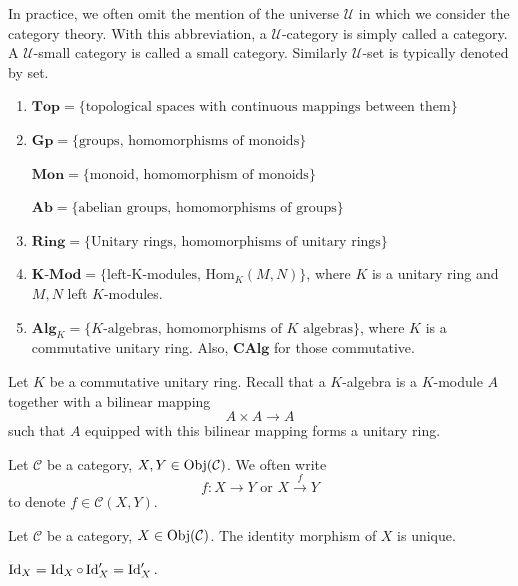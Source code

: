 \begin{remark}
    In practice, we often omit the mention of the universe $\mathcal{U}$ in which we consider the category theory. With this abbreviation, a $\mathcal{U}$-category is simply called a category. A $\mathcal{U}$-small category is called a small category. Similarly $\mathcal{U}$-set is typically denoted by set.
\end{remark}
\begin{notationenv}
    \quad
\begin{enumerate}[label=(\arabic*)]
    \item $\mathbf{Top} = \{\text{topological spaces with continuous mappings between them}\}$
    \item $\mathbf{Gp} = \{\text{groups, homomorphisms of monoids}\}$
    
        $\mathbf{Mon} = \{\text{monoid, homomorphism of monoids}\}$

        $\mathbf{Ab}= \{\text{abelian groups, homomorphisms of groups}\}$
    \item $\mathbf{Ring} = \{\text{Unitary rings, homomorphisms of unitary rings}\}$
    \item $\mathbf{K}\text{-}\mathbf{Mod} = \{\text{left-K-modules, }\mathrm{Hom}_K(M,N)\}$, where $K$ is a unitary ring and $M,N$ left $K$-modules.
    \item $\mathbf{Alg}_K=\{K\text{-algebras, homomorphisms of }K\text{ algebras}\}$, where $K$ is a commutative unitary ring.
        Also, $\mathbf{CAlg}$ for those commutative.
\end{enumerate}
\end{notationenv}
\begin{remark}
    Let $K$ be a commutative unitary ring. Recall that a $K$-algebra is a $K$-module $A$ together with a bilinear mapping $$A\times A\rightarrow A$$ such that $A$ equipped with this bilinear mapping forms a unitary ring.
\end{remark}
\begin{notationenv}
    Let $\mathcal{C}$ be a category, $X,Y\in \operatorname{\mathrm{Obj}}(\mathcal{C})$. We often write 
    $$ f: X\rightarrow Y \text{ or } X\overset{f}{\longrightarrow} Y$$
    to denote $f\in \mathcal{C}(X,Y)$.
\end{notationenv}
\begin{propositionenv}
    Let $\mathcal{C}$ be a category, $X\in \operatorname{\mathrm{Obj}}(\mathcal{C})$. The identity morphism of $X$ is unique.
\end{propositionenv}
\begin{proofenv}
    $ \operatorname{\mathrm{Id}}_X = \operatorname{\mathrm{Id}}_X \circ \operatorname{\mathrm{Id}}_X' = \operatorname{\mathrm{Id}}_X'.$
\end{proofenv}
